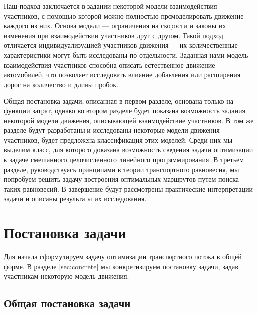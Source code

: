 \documentclass[12pt, a4paper]{article}
\begin{document}
Наш подход заключается в задании некоторой модели взаимодействия участников, с помощью которой можно полностью промоделировать движение каждого из них. Основа модели --- ограничения на скорости и законы их изменения при взаимодействии участников друг с другом. Такой подход отличается индивидуализуацией участников движения --- их количественные характеристики могут быть исследованы по отдельности. Заданная нами модель взаимодействия участников способна описать естественное движение автомобилей, что позволяет исследовать влияние добавления или расширения дорог на количество и длины пробок.

Общая постановка задачи, описанная в первом разделе, основана только на функции затрат, 
однако во втором разделе будет показана возможность задания некоторой модели движения, описывающей взаимодействие участников.
В том же разделе будут разработаны и исследованы некоторые модели движения участников, будет предложена классификация этих моделей. Среди них мы выделим класс, для которого доказана возможность сведения задачи оптимизации к задаче смешанного целочисленного линейного программирования. В третьем разделе, руководствуясь принципами в теории транспортного равновесия, мы попробуем решить задачу построения оптимальных маршрутов путем поиска таких равновесий. В завершение будут рассмотрены практические интерпретации задачи и описаны результаты их исследования.

\newpage
\section{Постановка задачи}

Для начала сформулируем задачу оптимизации транспортного потока в общей форме.
В разделе \ref{sec:concrete} мы конкретизируем постановку задачи, задав участникам некоторую модель движения.

\subsection{Общая постановка задачи}
\end{document}
